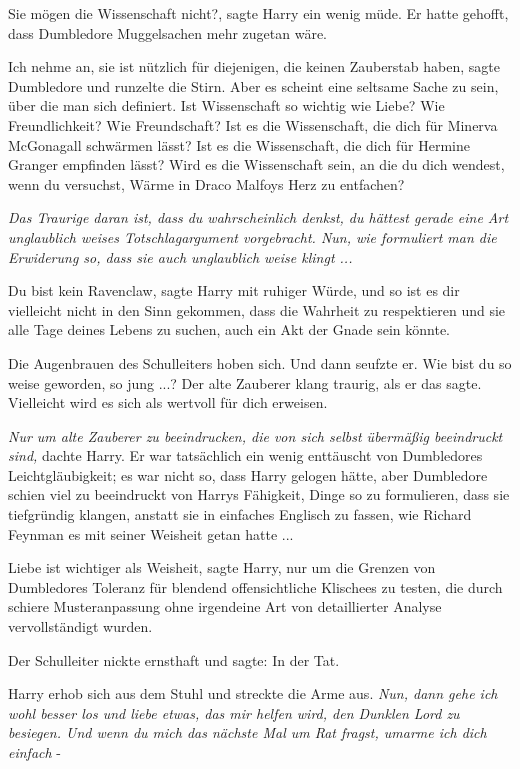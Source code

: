 \glqq{}Sie mögen die Wissenschaft nicht?\grqq{}, sagte Harry ein wenig müde. Er
hatte gehofft, dass Dumbledore Muggelsachen mehr zugetan wäre.

\glqq{}Ich nehme an, sie ist nützlich für diejenigen, die keinen Zauberstab
haben\grqq{}, sagte Dumbledore und runzelte die Stirn. \glqq{}Aber es scheint
eine seltsame Sache zu sein, über die man sich definiert. Ist Wissenschaft so
wichtig wie Liebe? Wie Freundlichkeit? Wie Freundschaft? Ist es die
Wissenschaft, die dich für Minerva McGonagall schwärmen lässt? Ist es die
Wissenschaft, die dich für Hermine Granger empfinden lässt? Wird es die
Wissenschaft sein, an die du dich wendest, wenn du versuchst, Wärme in Draco
Malfoys Herz zu entfachen?\grqq{}

\emph{Das Traurige daran ist, dass du wahrscheinlich denkst, du hättest gerade
eine Art unglaublich weises Totschlagargument vorgebracht. Nun, wie formuliert
man die Erwiderung so, dass sie auch unglaublich weise klingt ...}

\glqq{}Du bist kein Ravenclaw\grqq{}, sagte Harry mit ruhiger Würde, \glqq{}und so
ist es dir vielleicht nicht in den Sinn gekommen, dass die Wahrheit zu
respektieren und sie alle Tage deines Lebens zu suchen, auch ein Akt der Gnade
sein könnte.\grqq{}

Die Augenbrauen des Schulleiters hoben sich. Und dann seufzte er. \glqq{}Wie bist
du so weise geworden, so jung ...?\grqq{} Der alte Zauberer klang traurig, als
er das sagte. \glqq{}Vielleicht wird es sich als wertvoll für dich
erweisen.\grqq{}

\emph{Nur um alte Zauberer zu beeindrucken, die von sich selbst übermäßig
beeindruckt sind,} dachte Harry. Er war tatsächlich ein wenig enttäuscht von
Dumbledores Leichtgläubigkeit; es war nicht so, dass Harry gelogen hätte, aber
Dumbledore schien viel zu beeindruckt von Harrys Fähigkeit, Dinge so zu
formulieren, dass sie tiefgründig klangen, anstatt sie in einfaches Englisch zu
fassen, wie Richard Feynman es mit seiner Weisheit getan hatte ...

\glqq{}Liebe ist wichtiger als Weisheit\grqq{}, sagte Harry, nur um die Grenzen
von Dumbledores Toleranz für blendend offensichtliche Klischees zu testen, die
durch schiere Musteranpassung ohne irgendeine Art von detaillierter Analyse
vervollständigt wurden.

Der Schulleiter nickte ernsthaft und sagte: \glqq{}In der Tat.\grqq{}

Harry erhob sich aus dem Stuhl und streckte die Arme aus. \emph{Nun, dann gehe
ich wohl besser los und liebe etwas, das mir helfen wird, den Dunklen Lord zu
besiegen. Und wenn du mich das nächste Mal um Rat fragst, umarme ich dich
einfach} -


